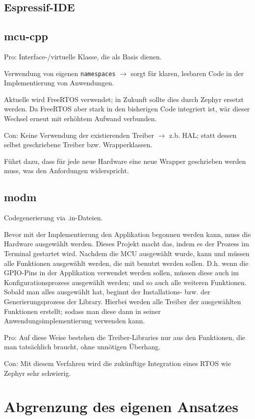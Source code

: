 \subsection{Espressif-IDE}


\subsection{mcu-cpp}
Pro:
Interface-/virtuelle Klasse, die als Basis dienen.

Verwendung von eigenen \texttt{namespaces} $\rightarrow$ sorgt für klaren, lesbaren Code in der Implementierung von Anwendungen.

Aktuelle wird FreeRTOS verwendet; in Zukunft sollte dies durch Zephyr ersetzt werden.
Da FreeRTOS aber stark in den bisherigen Code integriert ist, wär dieser Wechsel erneut mit erhöhtem Aufwand verbunden.



Con:
Keine Verwendung der existierenden Treiber $\rightarrow$ z.b. HAL; statt dessen selbst geschriebene Treiber bzw. Wrapperklassen.

Führt dazu, dass für jede neue Hardware eine neue Wrapper geschrieben werden muss, was den Anfordungen widerspricht.

\subsection{modm}
Codegenerierung via .in-Dateien.

Bevor mit der Implementierung den Applikation begonnen werden kann, muss die Hardware ausgewählt werden.
Dieses Projekt macht das, indem es der Prozess im Terminal gestartet wird.
Nachdem die MCU ausgewählt wurde, kann und müssen alle Funktionen ausgewählt werden, die mit benutzt werden sollen.
D.h. wenn die GPIO-Pins in der Applikation verwendet werden sollen, müssen diese auch im Konfigurationsprozess ausgewählt werden; und so auch alle weiteren Funktionen.
Sobald man alles ausgewählt hat, beginnt der Installations- bzw. der Generierungsprozess der Library. 
Hierbei werden alle Treiber der ausgewählten Funktionen erstellt; sodass man diese dann in seiner Anwendungsimplementierung verwenden kann.

Pro:
Auf diese Weise bestehen die Treiber-Libraries nur aus den Funktionen, die man tatsächlich braucht, ohne unnötigen Überhang.

Con:
Mit diesem Verfahren wird die zukünftige Integration eines RTOS wie Zephyr sehr schwierig.

\section{Abgrenzung des eigenen Ansatzes}



